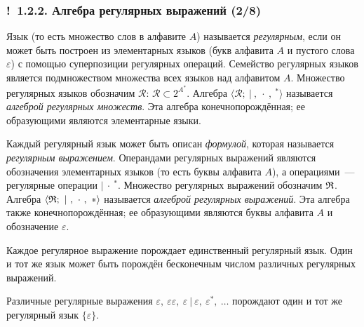 \documentclass[mathserif,12pt,aspectratio=169]{beamer}
\def\emразделенной{\em разделенной}
\renewcommand{\index}[1]{}
\def\em#1{\it\color{blue}#1}
\def\odmkey#1#2{{\it\color{red} #1}\index{#2}}
\let\cal\mathcal
\def\Ok{{\color{green}\textbf{!}\ }}
\begin{document}
\begin{frame}
\frametitle{\Ok 1.2.2. Алгебра регулярных выражений (2/8)}


Язык (то есть множество слов в алфавите $A$) называется \odmkey{регулярным}{Язык!регулярный}, если он
может быть построен из элементарных языков (букв алфавита $A$ и пустого слова 
$\varepsilon$)
с помощью суперпозиции регулярных операций. Семейство регулярных языков является подмножеством
множества всех языков над алфавитом $A$.
Множество регулярных языков обозначим $\cal{R}$:
$\cal{R} \subset 2^{A^*}.$
Алгебра $\langle \cal{R}; ~|~, ~\cdot~, ~{}^*\rangle$ называется \odmkey{алгеброй
регулярных множеств}{алгебра!регулярных!множеств}. Эта алгебра
конечнопорождённая; ее образующими являются
элементарные языки.

\smallskip
Каждый регулярный язык может быть описан {\em формулой}, которая называется \odmkey{регулярным
выражением}{Выражение!регулярное}. Операндами регулярных выражений являются обозначения 
элементарных языков (то есть буквы алфавита $A$), а операциями~--- регулярные операции 
$|~\cdot~{}^*$. 
Множество регулярных выражений обозначим $\frak{R}$.
Алгебра $\langle \frak{R}; ~|~, ~\cdot~, ~*\rangle$ называется \odmkey{алгеброй
регулярных выражений}{алгебра!регулярных!выражений}.  Эта алгебра
также конечнопорождённая; ее образующими являются
буквы алфавита $A$ и обозначение $\varepsilon$.

\smallskip
Каждое регулярное выражение порождает единственный регулярный язык.
Один и тот же язык может быть порождён бесконечным числом
различных регулярных выражений.
\begin{example}
Различные регулярные выражения 
$\varepsilon,\ \varepsilon\varepsilon,\ \varepsilon~|~\varepsilon,\ \varepsilon^*,\ \dots$
порождают один и тот же регулярный язык $\{\varepsilon\}$. 
\end{example}

\end{frame}
\end{document}
